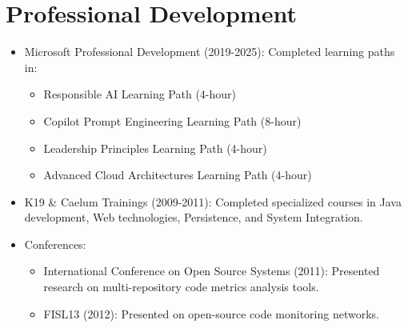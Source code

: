 
\section{Professional Development}
\begin{itemize}
    \item \small{Microsoft Professional Development (2019-2025):}
    \footnotesize{Completed learning paths in:}
    \begin{itemize}[itemsep=1pt, parsep=0pt]
        \item \footnotesize{Responsible AI Learning Path (4-hour)}%
        \item \footnotesize{Copilot Prompt Engineering Learning Path (8-hour)}%
        \item \footnotesize{Leadership Principles Learning Path (4-hour)}%
        \item \footnotesize{Advanced Cloud Architectures Learning Path (4-hour)}%
    \end{itemize}
    \item \small{K19 \& Caelum Trainings (2009-2011):}\footnotesize{ Completed specialized courses in Java development, Web technologies, Persistence, and System Integration.}
    \item \small{Conferences:}
    \begin{itemize}[itemsep=1pt, parsep=0pt]
        \item \footnotesize{International Conference on Open Source Systems (2011): Presented research on multi-repository code metrics analysis tools.}
        \item \footnotesize{FISL13 (2012): Presented on open-source code monitoring networks.}
    \end{itemize}
\end{itemize}